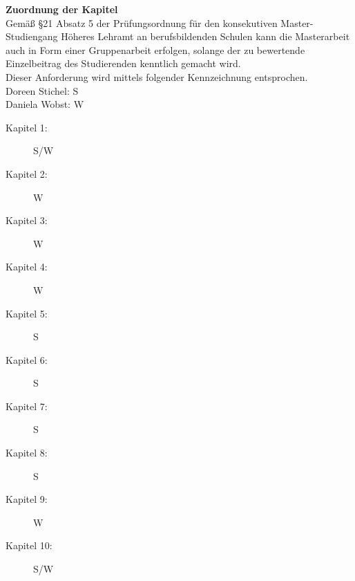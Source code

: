 \noindent
\textbf{Zuordnung der Kapitel}\\[0,5cm]
Gemäß §21 Absatz 5 der Prüfungsordnung für den konsekutiven Master-Studiengang Höheres Lehramt an berufsbildenden Schulen kann die Masterarbeit auch in Form einer Gruppenarbeit erfolgen, solange der zu bewertende Einzelbeitrag des Studierenden kenntlich gemacht wird.\\
Dieser Anforderung wird mittels folgender Kennzeichnung entsprochen.\\

\noindent
Doreen Stichel: S\\
Daniela Wobst: W\\

\begin{description}
	\item[Kapitel 1:] S/W
	\item[Kapitel 2:] W
	\item[Kapitel 3:] W
	\item[Kapitel 4:] W
	\item[Kapitel 5:] S
	\item[Kapitel 6:] S
	\item[Kapitel 7:] S
	\item[Kapitel 8:] S
	\item[Kapitel 9:] W
	\item[Kapitel 10:] S/W	
\end{description}

